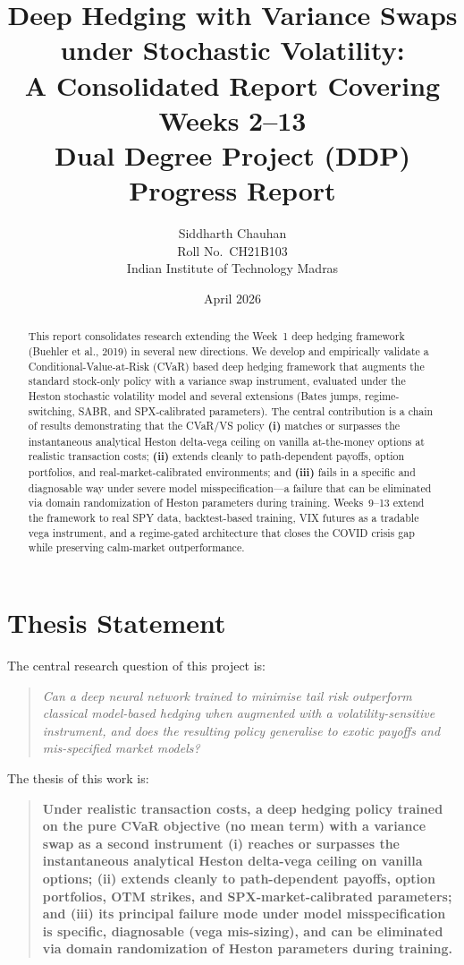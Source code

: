 \documentclass[11pt, a4paper]{article}
\title{
  \vspace{-2cm}
  \textbf{Deep Hedging with Variance Swaps under Stochastic Volatility:}\\[0.3em]
  \textbf{A Consolidated Report Covering Weeks 2--13}\\[0.5em]
  \large Dual Degree Project (DDP) Progress Report
}
\author{
  Siddharth Chauhan \\
  Roll No.\ CH21B103 \\
  Indian Institute of Technology Madras
}
\date{April 2026}
\begin{document}
\maketitle

\begin{abstract}
\noindent
This report consolidates research extending the Week~1 deep hedging
framework (Buehler et al., 2019) in several new directions. We develop and
empirically validate a Conditional-Value-at-Risk (CVaR) based deep hedging
framework that augments the standard stock-only policy with a variance swap
instrument, evaluated under the Heston stochastic volatility model and several
extensions (Bates jumps, regime-switching, SABR, and SPX-calibrated parameters).
The central contribution is a chain of results demonstrating that the
CVaR/VS policy \textbf{(i)} matches or surpasses the instantaneous analytical
Heston delta-vega ceiling on vanilla at-the-money options at realistic
transaction costs; \textbf{(ii)} extends cleanly to path-dependent payoffs,
option portfolios, and real-market-calibrated environments; and
\textbf{(iii)} fails in a specific and diagnosable way under severe model
misspecification---a failure that can be eliminated via domain
randomization of Heston parameters during training. Weeks~9--13 extend the
framework to real SPY data, backtest-based training, VIX futures as a
tradable vega instrument, and a regime-gated architecture that closes the
COVID crisis gap while preserving calm-market outperformance.
\end{abstract}

\tableofcontents
\newpage

\section{Thesis Statement}
\label{sec:thesis}

The central research question of this project is:

\begin{quote}
  \emph{Can a deep neural network trained to minimise tail risk outperform
  classical model-based hedging when augmented with a volatility-sensitive
  instrument, and does the resulting policy generalise to exotic payoffs
  and mis-specified market models?}
\end{quote}

The thesis of this work is:

\begin{quote}
  \textbf{
    Under realistic transaction costs, a deep hedging policy trained on
    the pure CVaR objective (no mean term) with a variance swap as a
    second instrument (i) reaches or surpasses the instantaneous
    analytical Heston delta-vega ceiling on vanilla options;
    (ii) extends cleanly to path-dependent payoffs, option portfolios,
    OTM strikes, and SPX-market-calibrated parameters;
    and (iii) its principal failure mode under model misspecification
    is specific, diagnosable (vega mis-sizing), and can be eliminated
    via domain randomization of Heston parameters during training.
  }
\end{quote}
\end{document}
